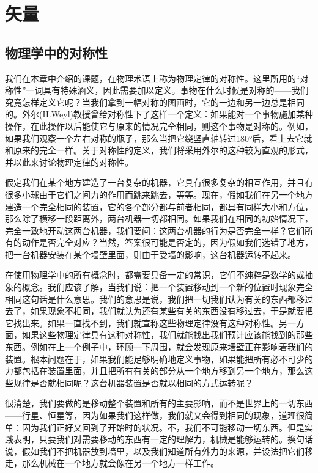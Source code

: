 \chapter{矢量}

\section{物理学中的对称性}

我们在本章中介绍的课题，在物理术语上称为物理定律的对称性。这里所用的“对称性”一词具有特殊涵义，因此需要加以定义。事物在什么时候是对称的——我们究竟怎样定义它呢？当我们拿到一幅对称的图画时，它的一边和另一边总是相同的。外尔(H.Weyl)教授曾给对称性下了这样一个定义：如果能对一个事物施加某种操作，在此操作以后能使它与原来的情况完全相同，则这个事物是对称的。例如，如果我们观察一个左右对称的瓶子，那么当把它绕竖直轴转过180°后，看上去它就和原来的完全一样。关于对称性的定义，我们将采用外尔的这种较为直观的形式，并以此来讨论物理定律的对称性。

假定我们在某个地方建造了一台复杂的机器，它具有很多复杂的相互作用，并且有很多小球由于它们之间力的作用而跳来跳去，等等。现在，假如我们在另一个地方建造一个完全相同的装置，它的各个部分都与前者相同，都具有同样大小和方位，那么除了横移一段距离外，两台机器一切都相同。如果我们在相同的初始情况下，完全一致地开动这两台机器，我们要问：这两台机器的行为是否完全一样？它们所有的动作是否完全对应？当然，答案很可能是否定的，因为假如我们选错了地方，把一台机器安装在某个墙壁里面，则由于受墙的影响，这台机器运转不起来。

在使用物理学中的所有概念时，都需要具备一定的常识，它们不纯粹是数学的或抽象的概念。我们应该了解，当我们说：把一个装置移动到一个新的位置时现象完全相同这句话是什么意思。我们的意思是说，我们把一切我们认为有关的东西都移过去了，如果现象不相同，我们就认为还有某些有关的东西没有移过去，于是就要把它找出来。如果一直找不到，我们就宣称这些物理定律没有这种对称性。另一方面，如果这些物理定律具有这种对称性，我们就能找出我们预计应该能找到的那些东西。例如在上一个例子中，环顾一下周围，就会发现原来墙壁正在影响着我们的装置。根本问题在于，如果我们能足够明确地定义事物，如果能把所有必不可少的力都包括在装置里面，并且把所有有关的部分从一个地方移到另一个地方，那么这些规律是否就相同呢？这台机器装置是否就以相同的方式运转呢？

很清楚，我们要做的是移动整个装置和所有的主要影响，而不是世界上的一切东西——行星、恒星等，因为如果我们这样做，我们就又会得到相同的现象，道理很简单：因为我们正好又回到了开始时的状况。不，我们不可能移动一切东西。但是实践表明，只要我们对需要移动的东西有一定的理解力，机械是能够运转的。换句话说，假如我们不把机器放到墙里，以及我们知道所有外力的来源，并设法把它们移走，那么机械在一个地方就会像在另一个地方一样工作。

